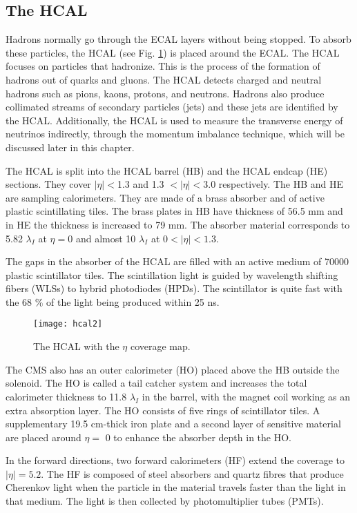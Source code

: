\begin{normalsize}
\subsection{The HCAL}

Hadrons normally go through the ECAL layers without being stopped. To absorb these particles, the HCAL \cite{HCAL_TDR} (see Fig. \ref{hcal2}) is placed around the ECAL. The HCAL focuses on particles that hadronize. This is the process of the formation of hadrons out of quarks and gluons. The HCAL detects charged and neutral hadrons such as pions, kaons, protons, and neutrons. Hadrons also produce collimated streams of secondary particles (jets) and these jets are identified by the HCAL. Additionally, the HCAL is used to measure the transverse energy of neutrinos indirectly, through the momentum imbalance technique, which will be discussed later in this chapter. 

The HCAL is split into the HCAL barrel (HB) and the HCAL endcap (HE) sections. They cover $ |\eta| < $1.3 and 1.3 $< |\eta| < $3.0 respectively. The HB and HE are sampling calorimeters. They are made of a brass absorber and of active plastic scintillating tiles. The brass plates in HB have thickness of 56.5 mm and in HE the thickness is increased to 79 mm. The absorber material corresponds to 5.82 $\lambda_I$ at $\eta = 0$ and almost 10 $\lambda_I$ at $0 < |\eta| < 1.3$.

The gaps in the absorber of the HCAL are filled with an active medium of 70000 plastic scintillator tiles. The scintillation light is guided by wavelength shifting fibers (WLSs) to hybrid photodiodes (HPDs). The scintillator is quite fast with the 68 $\%$ of the light being produced within 25 ns.

\begin{figure}[H]
  \centering
  \texttt{[image: hcal2]}
  \caption[The HCAL]{The HCAL with the $\eta$ coverage map.}
  \label{hcal2}
\end{figure}


The CMS also has an outer calorimeter (HO) placed above the HB outside the solenoid. The HO is called a tail catcher system and increases the total calorimeter thickness to 11.8 $\lambda_I$ in the barrel, with the magnet coil working as an extra absorption layer. The HO consists of five rings of scintillator tiles. A supplementary 19.5 cm-thick iron plate and a second layer of sensitive material are placed around $\eta =$ 0 to enhance the absorber depth in the HO. 

In the forward directions, two forward calorimeters (HF) extend the coverage to  $|\eta| = 5.2$. The HF is composed of steel absorbers and quartz fibres that produce Cherenkov light when the particle in the material travels faster than the light in that medium. The light is then collected by photomultiplier tubes (PMTs). 



\end{normalsize}
